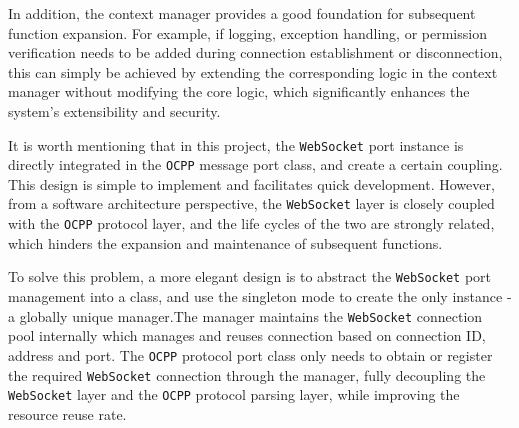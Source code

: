\documentclass[
english,
ruledheaders=section,%
class=report,%
thesis={type=Report},%
accentcolor=9c,%
custommargins=true,%
marginpar=false,%
parskip=half-,%
fontsize=11pt,%
logofile={img/tuda_logo.pdf}, %
]{tudapub}
\begin{document}
    In addition, the context manager provides a good foundation for subsequent function expansion. For example, if logging, exception handling, or permission verification needs to be added during connection establishment or disconnection, this can simply be achieved by extending the corresponding logic in the context manager without modifying the core logic, which significantly enhances the system's extensibility and security.


    It is worth mentioning that in this project, the \texttt{WebSocket} port instance is directly integrated in the \texttt{OCPP} message port class, and create a certain coupling. This design is simple to implement and facilitates quick development. However, from a software architecture perspective, the \texttt{WebSocket} layer is closely coupled with the \texttt{OCPP} protocol layer, and the life cycles of the two are strongly related, which hinders the expansion and maintenance of subsequent functions.



    To solve this problem, a more elegant design is to abstract the \texttt{WebSocket} port management into a  class, and use the singleton mode to create the only instance - a globally unique manager.The manager maintains the \texttt{WebSocket} connection pool internally which manages and reuses connection based on connection ID, address and port. The \texttt{OCPP} protocol port class only needs to obtain or register the required \texttt{WebSocket} connection through the manager, fully decoupling the \texttt{WebSocket} layer and the \texttt{OCPP} protocol parsing layer, while improving the resource reuse rate.
\end{document}
